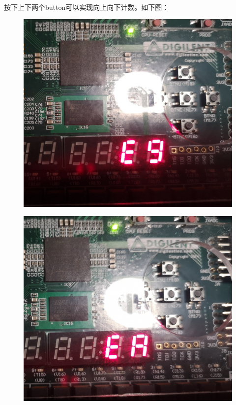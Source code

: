 \documentclass[UTF8]{article}
\begin{document}
	按下上下两个button可以实现向上向下计数。如下图：\par
	\begin{figure}[H]
		\begin{minipage}[H]{0.48\linewidth}
			\centering
			\includegraphics[scale=0.1]{e3_1.jpg}
			\label{e3_1}
		\end{minipage}
		\qquad
		\begin{minipage}[H]{0.48\linewidth}
			\centering
			\includegraphics[scale=0.1]{e3_2.jpg}
			\label{e3_2}
		\end{minipage}
	\end{figure}
\end{document}
